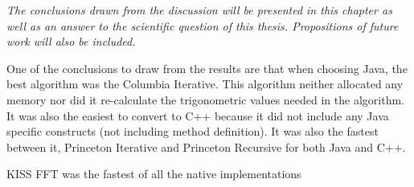 \textit{The conclusions drawn from the discussion will be presented in this chapter as well as an answer to the scientific question of this thesis. Propositions of future work will also be included.}


One of the conclusions to draw from the results are that when choosing Java, the best algorithm was the Columbia Iterative. This algorithm neither allocated any memory nor did it re-calculate the trigonometric values needed in the algorithm. It was also the easiest to convert to C++ because it did not include any Java specific constructs (not including method definition). It was also the fastest between it, Princeton Iterative and Princeton Recursive for both Java and C++.

KISS FFT was the fastest of all the native implementations 




